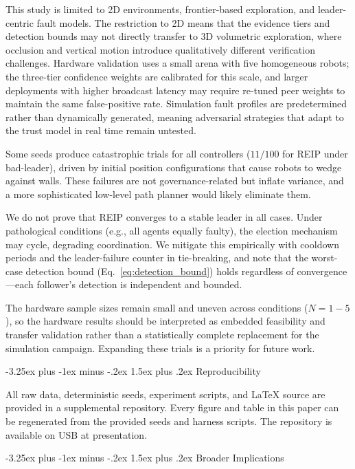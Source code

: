\documentclass[conference]{IEEEtran}
\makeatletter
\renewcommand{\subsection}{\@startsection{subsection}{2}{\z@}%
  {-3.25ex plus -1ex minus -.2ex}%
  {1.5ex plus .2ex}%
  {\normalfont\normalsize\itshape\centering}}
\makeatother
\begin{document}
This study is limited to 2D environments, frontier-based exploration, and leader-centric fault models. The restriction to 2D means that the evidence tiers and detection bounds may not directly transfer to 3D volumetric exploration, where occlusion and vertical motion introduce qualitatively different verification challenges. Hardware validation uses a small arena with five homogeneous robots; the three-tier confidence weights are calibrated for this scale, and larger deployments with higher broadcast latency may require re-tuned peer weights to maintain the same false-positive rate. Simulation fault profiles are predetermined rather than dynamically generated, meaning adversarial strategies that adapt to the trust model in real time remain untested.

Some seeds produce catastrophic trials for all controllers ($11/100$ for REIP under bad-leader), driven by initial position configurations that cause robots to wedge against walls. These failures are not governance-related but inflate variance, and a more sophisticated low-level path planner would likely eliminate them.

We do not prove that REIP converges to a stable leader in all cases. Under pathological conditions (e.g., all agents equally faulty), the election mechanism may cycle, degrading coordination. We mitigate this empirically with cooldown periods and the leader-failure counter in tie-breaking, and note that the worst-case detection bound (Eq.~\ref{eq:detection_bound}) holds regardless of convergence---each follower's detection is independent and bounded.

The hardware sample sizes remain small and uneven across conditions ($N{=}1{-}5$), so the hardware results should be interpreted as embedded feasibility and transfer validation rather than a statistically complete replacement for the simulation campaign. Expanding these trials is a priority for future work.

\subsection{Reproducibility}

All raw data, deterministic seeds, experiment scripts, and \LaTeX{} source are provided in a supplemental repository. Every figure and table in this paper can be regenerated from the provided seeds and harness scripts. The repository is available on USB at presentation.

\subsection{Broader Implications}
\end{document}
